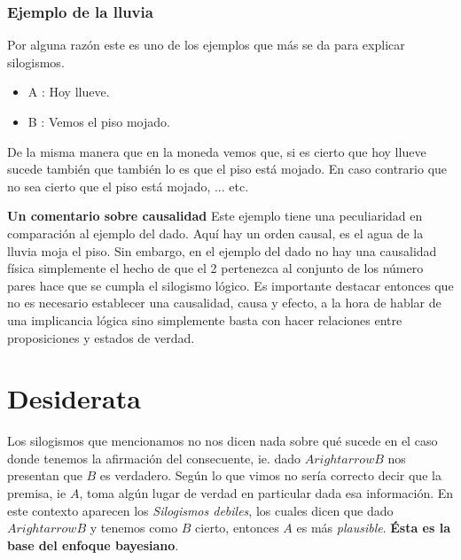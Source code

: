 \documentclass[aps,onecolumn,12pt,notitlepage]{revtex4-1}
\begin{document}
\subsubsection{Ejemplo de la lluvia}
Por alguna razón este es uno de los ejemplos que más se da para explicar silogismos.
\begin{itemize}
\item A : Hoy llueve.
\item B	: Vemos el piso mojado.
\end{itemize}
De la misma manera que en la moneda vemos que, si es cierto que hoy llueve sucede también que también lo es que el piso está mojado. En caso contrario que no sea cierto que el piso está mojado, ... etc.

\textbf{Un comentario sobre causalidad}
\newline
Este ejemplo tiene una peculiaridad en comparación al ejemplo del dado. Aquí hay un orden causal, es el agua de la lluvia moja el piso. Sin embargo, en el ejemplo del dado no hay una causalidad física simplemente el hecho de que el 2 pertenezca al conjunto de los número pares hace que se cumpla el silogismo lógico. Es importante destacar entonces que no es necesario establecer una causalidad, causa y efecto, a la hora de hablar de una implicancia lógica sino simplemente basta con hacer relaciones entre proposiciones y estados de verdad.

\section{Desiderata}
Los silogismos que mencionamos no nos dicen nada sobre qué sucede en el caso donde tenemos la afirmación del consecuente, ie. dado $A rightarrow B$ nos presentan que $B$ es verdadero. Según lo que vimos no sería correcto decir que la premisa, ie $A$, toma algún lugar de verdad en particular dada esa información. En este contexto aparecen los \textit{Silogismos debiles}, los cuales dicen que dado $A rightarrow B$ y tenemos como $B$ cierto, entonces $A$ es más \textit{plausible}.       \textbf{Ésta es la base del enfoque bayesiano}.
\end{document}
